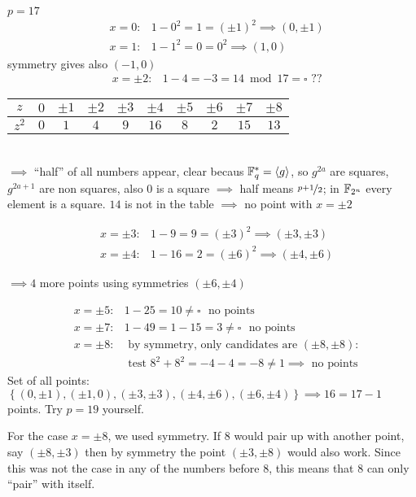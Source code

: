 \begin{example} \ \\
$p = 17$
\begin{align*}
&x=0: &1-0^2 =1 = (\pm 1)^2 \implies (0,\pm 1) \\
&x=1: &1-1^2 =0 = 0^2 \implies (1,0) 
\end{align*}
symmetry gives also $(-1,0)$
\begin{align*}
&x=\pm 2: &1-4 =-3 = 14 \bmod 17 = \square \,\, ?? 
\end{align*}

\bgroup
\def\arraystretch{1.5}
\begin{tabular}{c|c|c|c|c|c|c|c|c|c}
 $z$ & $0$ & $\pm1$ & $\pm2$& $\pm3$& $\pm4$& $\pm5$& $\pm6$& $\pm7$& $\pm8$ \\ \hline
$z^2$& $0$ & $1$ & $4$& $9$& $16$& $8$& $2$& $15$& $13$
\end{tabular}
\egroup \ \\

$\implies$ ``half'' of all numbers appear, clear becaus $\mathbb{F}_q^{\ast} = \langle g \rangle$, so $g^{2a}$ are squares, $g^{2a+1}$ are non squares, also 0 is a square $\implies$ half means $\nicefrac{p+1}{2}$; in $\mathbb{F}_{2^n}$ every element is a square.
$14$ is not in the table $\implies$ no point with $x= \pm 2$

\begin{align*}
&x=\pm 3: &1-9 =9 = (\pm 3)^2 \implies (\pm 3, \pm 3) \\
&x=\pm 4: &1-16 =2 = (\pm 6)^2 \implies (\pm 4, \pm 6)
\end{align*}

$\implies 4$ more points using symmetries $(\pm 6, \pm 4)$

\begin{align*}
&x=\pm 5: &1-25 =10 \neq \square \,\,\text{ no points} \\
&x=\pm 7: &1-49 =1-15 = 3  \neq \square \,\,\text{ no points} \\
&x=\pm 8: &\text{ by symmetry, only candidates are } (\pm 8, \pm 8): \\
& &\text{ test } 8^2+8^2 = -4-4 = -8 \neq 1 \implies \text{ no points}
\end{align*}
Set of all points: $\left\lbrace(0,\pm 1), (\pm 1,0), (\pm 3, \pm 3), (\pm 4, \pm 6), (\pm 6, \pm 4) \right\rbrace \implies 16 = 17 - 1$ points. Try $p=19$ yourself.

\begin{remark}
For the case $x=\pm 8$, we used symmetry. If $8$ would pair up with another point, say $(\pm 8 , \pm 3)$ then by symmetry the point $(\pm 3, \pm 8)$ would also work. Since this was not the case in any of the numbers before $8$, this means that $8$ can only ``pair'' with itself.
\end{remark}
\end{example}

